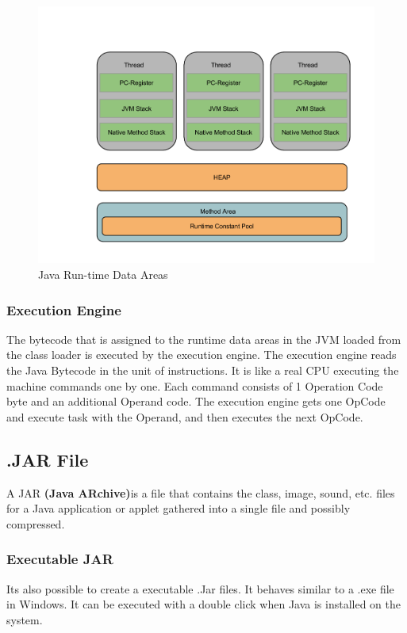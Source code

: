 \begin{figure}[H]
\centering
\includegraphics[width=1.0\linewidth]{graphics/java-data-areas.PNG}
\caption{Java Run-time Data Areas}
\end{figure}
\newpage

\subsubsection{Execution Engine}
The bytecode that is assigned to the runtime data areas in the JVM loaded from the class loader is executed by the execution engine. The execution engine reads the Java Bytecode in the unit of instructions. It is like a real CPU executing the machine commands one by one. Each command consists of 1 Operation Code byte and an additional Operand code. The execution engine gets one OpCode and execute task with the Operand, and then executes the next OpCode.\cite{javaJVM}  

\subsection{.JAR File}
A JAR \textbf{(Java ARchive)}is a file  that contains the class, image, sound, etc. files for a Java application or applet gathered into a single file and possibly compressed. \cite{javaJarMargaret}

\subsubsection{Executable JAR }
Its also possible to create a executable .Jar files. It behaves similar to a .exe file in Windows. It can be executed with a double click when Java is installed on the system. 

